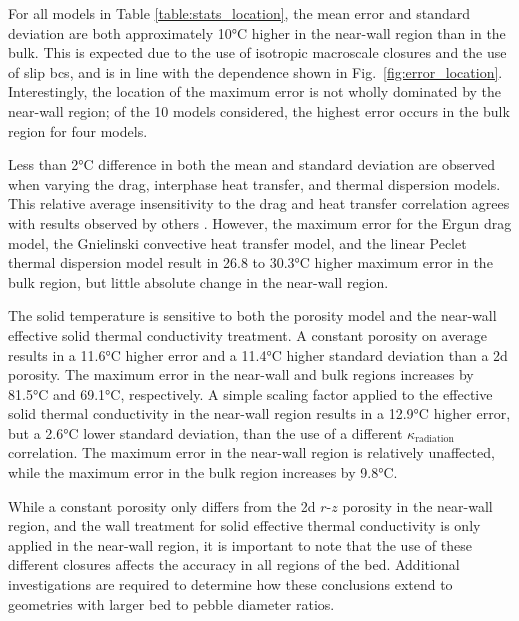 For all models in Table \ref{table:stats_location}, the mean error and standard deviation are both approximately 10\si{\celsius} higher in the near-wall region than in the bulk. This is expected due to the use of isotropic macroscale closures and the use of slip \glspl{bc}, and is in line with the dependence shown in Fig.\ \ref{fig:error_location}. Interestingly, the location of the maximum error is not wholly dominated by the near-wall region; of the 10 models considered, the highest error occurs in the bulk region for four models.

Less than 2\si{\celsius} difference in both the mean and standard deviation are observed when varying the drag, interphase heat transfer, and thermal dispersion models. This relative average insensitivity to the drag and heat transfer correlation agrees with results observed by others \cite{becker}. However, the maximum error for the Ergun drag model, the Gnielinski convective heat transfer model, and the linear Peclet thermal dispersion model result in 26.8 to 30.3\si{\celsius} higher maximum error in the bulk region, but little absolute change in the near-wall region. 

The solid temperature is sensitive to both the porosity model and the near-wall effective solid thermal conductivity treatment. A constant porosity on average results in a 11.6\si{\celsius} higher error and a 11.4\si{\celsius} higher standard deviation than a \gls{2d} porosity. The maximum error in the near-wall and bulk regions increases by 81.5\si{\celsius} and 69.1\si{\celsius}, respectively. A simple scaling factor applied to the effective solid thermal conductivity in the near-wall region results in a 12.9\si{\celsius} higher error, but a 2.6\si{\celsius} lower standard deviation, than the use of a different \(\kappa_\text{radiation}\) correlation. The maximum error in the near-wall region is relatively unaffected, while the maximum error in the bulk region increases by 9.8\si{\celsius}.

While a constant porosity only differs from the \gls{2d} \(r\)-\(z\) porosity in the near-wall region, and the wall treatment for solid effective thermal conductivity is only applied in the near-wall region, it is important to note that the use of these different closures affects the accuracy in all regions of the bed. Additional investigations are required to determine how these conclusions extend to geometries with larger bed to pebble diameter ratios. 

